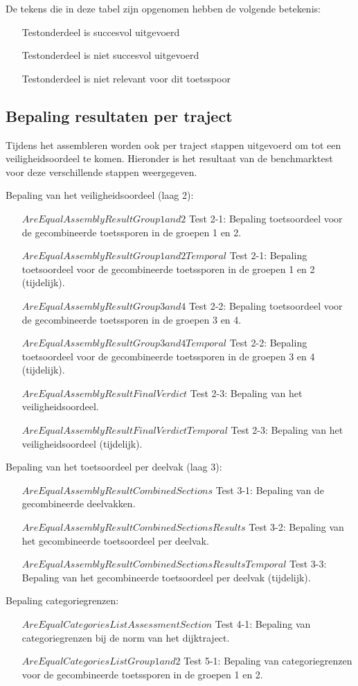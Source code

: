 De tekens die in deze tabel zijn opgenomen hebben de volgende betekenis:
\begin{itemize}
	\item [\cmark] Testonderdeel is succesvol uitgevoerd
	\item [\xmark] Testonderdeel is niet succesvol uitgevoerd
	\item [\nmark] Testonderdeel is niet relevant voor dit toetsspoor
\end{itemize}

\subsection{Bepaling resultaten per traject}
	\label{sec:$Order$:pertraject}
Tijdens het assembleren worden ook per traject stappen uitgevoerd om tot een veiligheidsoordeel te komen. Hieronder is het resultaat van de benchmarktest voor deze verschillende stappen weergegeven.

Bepaling van het veiligheidsoordeel (laag 2):
\begin{itemize}
	\item [$AreEqualAssemblyResultGroup1and2$]Test 2-1: Bepaling toetsoordeel voor de gecombineerde toetssporen in de groepen 1 en 2.
	\item [$AreEqualAssemblyResultGroup1and2Temporal$]Test 2-1: Bepaling toetsoordeel voor de gecombineerde toetssporen in de groepen 1 en 2 (tijdelijk).
	\item [$AreEqualAssemblyResultGroup3and4$]Test 2-2: Bepaling toetsoordeel voor de gecombineerde toetssporen in de groepen 3 en 4.
	\item [$AreEqualAssemblyResultGroup3and4Temporal$]Test 2-2: Bepaling toetsoordeel voor de gecombineerde toetssporen in de groepen 3 en 4 (tijdelijk).
	\item [$AreEqualAssemblyResultFinalVerdict$]Test 2-3: Bepaling van het veiligheidsoordeel.
	\item [$AreEqualAssemblyResultFinalVerdictTemporal$]Test 2-3: Bepaling van het veiligheidsoordeel (tijdelijk).
\end{itemize}

Bepaling van het toetsoordeel per deelvak (laag 3):
\begin{itemize}
	\item [$AreEqualAssemblyResultCombinedSections$] Test 3-1: Bepaling van de gecombineerde deelvakken.
	\item [$AreEqualAssemblyResultCombinedSectionsResults$] Test 3-2: Bepaling van het gecombineerde toetsoordeel per deelvak.
	\item [$AreEqualAssemblyResultCombinedSectionsResultsTemporal$] Test 3-3: Bepaling van het gecombineerde toetsoordeel per deelvak (tijdelijk).
\end{itemize}

Bepaling categoriegrenzen:
\begin{itemize}
	\item [$AreEqualCategoriesListAssessmentSection$]Test 4-1: Bepaling van categoriegrenzen bij de norm van het dijktraject.
	\item [$AreEqualCategoriesListGroup1and2$]Test 5-1: Bepaling van categoriegrenzen voor de gecombineerde toetssporen in de groepen 1 en 2.
\end{itemize}
